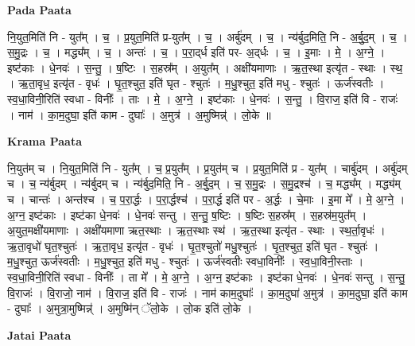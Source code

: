 \documentclass[17pt]{extarticle}
\begin{document}
\textbf{Pada Paata} \newline

नि॒युत॒मिति॑ नि - युत᳚म् । च॒ । प्र॒युत॒मिति॑ प्र-युत᳚म् । च॒ । अर्बु॑दम् । च॒ । न्य॑र्बुद॒मिति॒ नि - अ॒र्बु॒द॒म् । च॒ । स॒मु॒द्रः । च॒ । मद्ध्य᳚म् । च॒ । अन्तः॑ । च॒ । प॒रा॒द्‌र्ध इति॑ पर- अ॒द्‌र्धः । च॒ । इ॒माः । मे॒ । अ॒ग्ने॒ । इष्ट॑काः । धे॒नवः॑ । स॒न्तु॒ । ष॒ष्टिः । स॒हस्र᳚म् । अ॒युत᳚म् । अक्षी॑यमाणाः । ऋ॒त॒स्था इत्यृ॑त - स्थाः । स्थ॒ । ऋ॒ता॒वृध॒ इत्यृ॑त - वृधः॑ । घृ॒त॒श्चुत॒ इति॑ घृत - श्चुतः॑ । म॒धु॒श्चुत॒ इति॑ मधु - श्चुतः॑ । ऊर्ज॑स्वतीः । स्व॒धा॒विनी॒रिति॑ स्वधा - विनीः᳚ । ताः । मे॒ । अ॒ग्ने॒ । इष्ट॑काः । धे॒नवः॑ । स॒न्तु॒ । वि॒राज॒ इति॑ वि - राजः॑ । नाम॑ । का॒म॒दुघा॒ इति॑ काम - दुघाः᳚ । अ॒मुत्र॑ । अ॒मुष्मिन्न्॑ । लो॒के ॥  \newline


\textbf{Krama Paata} \newline

नि॒युत॑म् च । नि॒युत॒मिति॑ नि - युत᳚म् । च॒ प्र॒युत᳚म् । प्र॒युत॑म् च । प्र॒युत॒मिति॑ प्र - युत᳚म् । चार्बु॑दम् । अर्बु॑दम् च । च॒ न्य॑र्बुदम् । न्य॑र्बुदम् च । न्य॑र्बुद॒मिति॒ नि - अ॒र्बु॒द॒म् । च॒ स॒मु॒द्रः । स॒मु॒द्रश्च॑ । च॒ मद्ध्य᳚म् । मद्ध्य॑म् च । चान्तः॑ । अन्त॑श्च । च॒ प॒रा॒र्द्धः । प॒रा॒र्द्धश्च॑ । प॒रा॒र्द्ध इति॑ पर - अ॒र्द्धः । चे॒माः । इ॒मा मे᳚ । मे॒ अ॒ग्ने॒ । अ॒ग्न॒ इष्ट॑काः । इष्ट॑का धे॒नवः॑ । धे॒नवः॑ सन्तु । स॒न्तु॒ ष॒ष्टिः । ष॒ष्टिः स॒हस्र᳚म् । स॒हस्र॑म॒युत᳚म् । अ॒युत॒मक्षी॑यमाणाः । अक्षी॑यमाणा ऋत॒स्थाः । ऋ॒त॒स्थाः स्थ॑ । ऋ॒त॒स्था इत्यृ॑त - स्थाः । स्थ॒र्ता॒वृधः॑ । ऋ॒ता॒वृधो॑ घृत॒श्चुतः॑ । ऋ॒ता॒वृध॒ इत्यृ॑त - वृधः॑ । घृ॒त॒श्चुतो॑ मधु॒श्चुतः॑ । घृ॒त॒श्चुत॒ इति॑ घृत - श्चुतः॑ । म॒धु॒श्चुत॒ ऊर्ज॑स्वतीः । म॒धु॒श्चुत॒ इति॑ मधु - श्चुतः॑ । ऊर्ज॑स्वतीः स्वधा॒विनीः᳚ । स्व॒धा॒विनी॒स्ताः । स्व॒धा॒विनी॒रिति॑ स्वधा - विनीः᳚ । ता मे᳚ । मे॒ अ॒ग्ने॒ । अ॒ग्न॒ इष्ट॑काः । इष्ट॑का धे॒नवः॑ । धे॒नवः॑ सन्तु । स॒न्तु॒ वि॒राजः॑ । वि॒राजो॒ नाम॑ । वि॒राज॒ इति॑ वि - राजः॑ । नाम॑ काम॒दुघाः᳚ । का॒म॒दुघा॑ अ॒मुत्र॑ । का॒म॒दुघा॒ इति॑ काम - दुघाः᳚ । अ॒मुत्रा॒मुष्मिन्न्॑ । अ॒मुष्मि॑न् ॅलो॒के । लो॒क इति॑ लो॒के । \newline

\textbf{Jatai Paata} \newline
\end{document}
